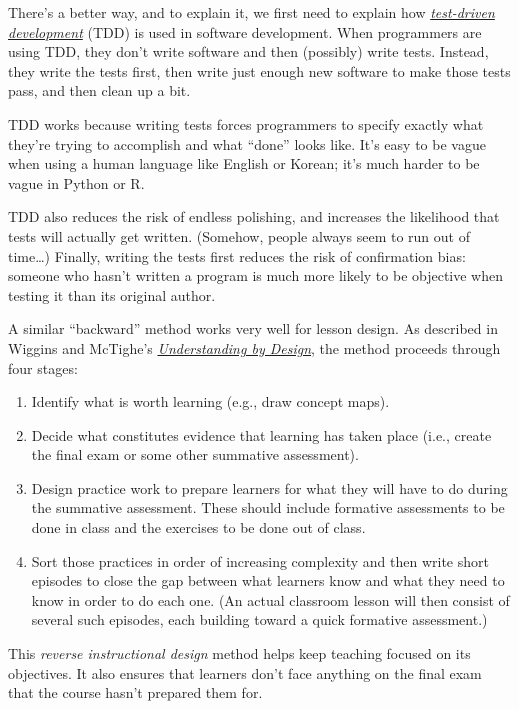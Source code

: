 There's a better way, and to explain it, we first need to explain how
\emph{\href{https://en.wikipedia.org/wiki/Test-driven\_development}{test-driven
development}} (TDD) is used in software development. When programmers
are using TDD, they don't write software and then (possibly) write
tests. Instead, they write the tests first, then write just enough new
software to make those tests pass, and then clean up a bit.

TDD works because writing tests forces programmers to specify exactly
what they're trying to accomplish and what ``done'' looks like. It's
easy to be vague when using a human language like English or Korean;
it's much harder to be vague in Python or R.

TDD also reduces the risk of endless polishing, and increases the
likelihood that tests will actually get written. (Somehow, people always
seem to run out of time\ldots{}) Finally, writing the tests first
reduces the risk of confirmation bias: someone who hasn't written a
program is much more likely to be objective when testing it than its
original author.

A similar ``backward'' method works very well for lesson design. As
described in Wiggins and McTighe's
\emph{\href{http://www.amazon.com/Understanding-Design-Expanded-Grant-Wiggins/dp/0131950843/}{Understanding
by Design}}, the method proceeds through four stages:

\begin{enumerate}
\def\labelenumi{\arabic{enumi}.}
\itemsep1pt\parskip0pt
\item
  Identify what is worth learning (e.g., draw concept maps).
\item
  Decide what constitutes evidence that learning has taken place (i.e.,
  create the final exam or some other summative assessment).
\item
  Design practice work to prepare learners for what they will have to do
  during the summative assessment. These should include formative
  assessments to be done in class and the exercises to be done out of
  class.
\item
  Sort those practices in order of increasing complexity and then write
  short episodes to close the gap between what learners know and what
  they need to know in order to do each one. (An actual classroom lesson
  will then consist of several such episodes, each building toward a
  quick formative assessment.)
\end{enumerate}

This \emph{reverse instructional design} method helps keep teaching
focused on its objectives. It also ensures that learners don't face
anything on the final exam that the course hasn't prepared them for.


